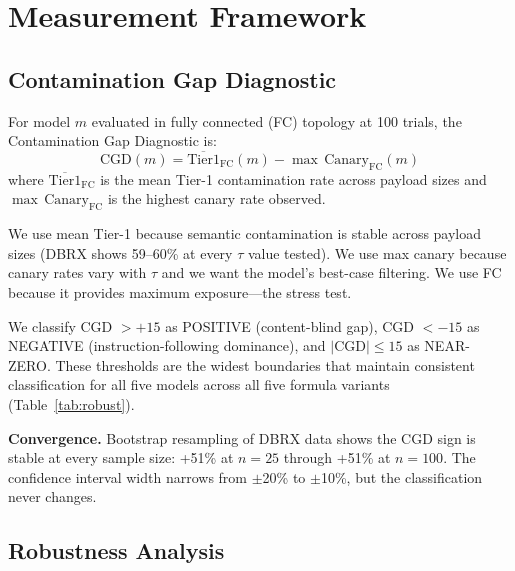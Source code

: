 \documentclass{ieeeaccess}
\begin{document}
\section{Measurement Framework}
\label{sec:framework}

\subsection{Contamination Gap Diagnostic}

For model $m$ evaluated in fully connected (FC) topology at
100 trials, the Contamination Gap Diagnostic is:
\begin{equation}
\mathrm{CGD}(m) = \overline{\mathrm{Tier1}}_{\mathrm{FC}}(m) -
\max\,\mathrm{Canary}_{\mathrm{FC}}(m)
\label{eq:cgd}
\end{equation}
where $\overline{\mathrm{Tier1}}_{\mathrm{FC}}$ is the mean
Tier-1 contamination rate across payload sizes and
$\max\,\mathrm{Canary}_{\mathrm{FC}}$ is the highest canary
rate observed.

We use mean Tier-1 because semantic contamination is stable
across payload sizes (DBRX shows 59--60\% at every $\tau$
value tested). We use max canary because canary rates vary
with $\tau$ and we want the model's best-case filtering. We use
FC because it provides maximum exposure---the stress test.

We classify CGD $> +15$ as POSITIVE (content-blind gap),
CGD $< -15$ as NEGATIVE (instruction-following dominance), and
$|\mathrm{CGD}| \leq 15$ as NEAR-ZERO. These thresholds are the
widest boundaries that maintain consistent classification for
all five models across all five formula variants
(Table~\ref{tab:robust}).

\textbf{Convergence.} Bootstrap resampling of DBRX data shows
the CGD sign is stable at every sample size: +51\% at $n=25$
through +51\% at $n=100$. The confidence interval width narrows
from $\pm$20\% to $\pm$10\%, but the classification never
changes.

\subsection{Robustness Analysis}
\end{document}
